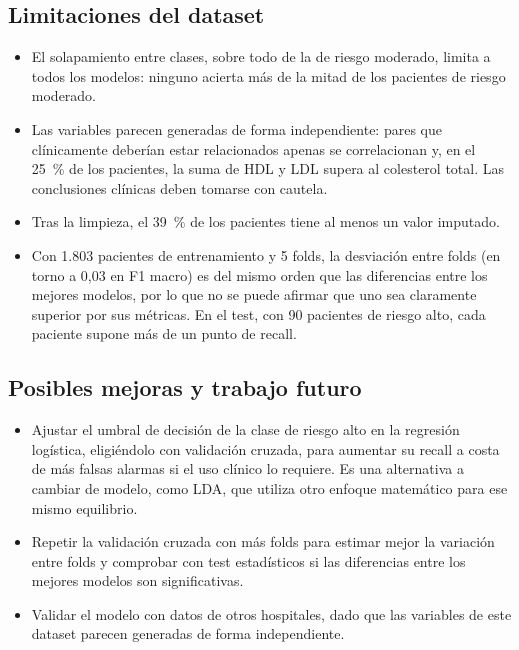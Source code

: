 \documentclass[journal,onecolumn]{IEEEtran}
\begin{document}
\subsection{Limitaciones del dataset}
\begin{itemize}
\item El solapamiento entre clases, sobre todo de la de riesgo moderado, limita a todos los modelos:
ninguno acierta más de la mitad de los pacientes de riesgo moderado.
\item Las variables parecen generadas de forma independiente: pares que clínicamente deberían estar
relacionados apenas se correlacionan y, en el 25~\% de los pacientes, la suma de HDL y LDL supera al
colesterol total. Las conclusiones clínicas deben tomarse con cautela.
\item Tras la limpieza, el 39~\% de los pacientes tiene al menos un valor imputado.
\item Con 1.803 pacientes de entrenamiento y 5 folds, la desviación entre folds (en torno a 0,03 en
F1 macro) es del mismo orden que las diferencias entre los mejores modelos, por lo que no se puede
afirmar que uno sea claramente superior por sus métricas. En el test, con 90 pacientes de riesgo alto,
cada paciente supone más de un punto de recall.
\end{itemize}

\subsection{Posibles mejoras y trabajo futuro}
\begin{itemize}
\item Ajustar el umbral de decisión de la clase de riesgo alto en la regresión logística, eligiéndolo
con validación cruzada, para aumentar su recall a costa de más falsas alarmas si el uso clínico lo
requiere. Es una alternativa a cambiar de modelo, como LDA, que utiliza otro enfoque matemático para
ese mismo equilibrio.
\item Repetir la validación cruzada con más folds para estimar mejor la
variación entre folds y comprobar con test estadísticos si las diferencias entre los mejores modelos
son significativas.
\item Validar el modelo con datos de otros hospitales, dado que las variables de este dataset parecen
generadas de forma independiente.
\end{itemize}



\end{document}
